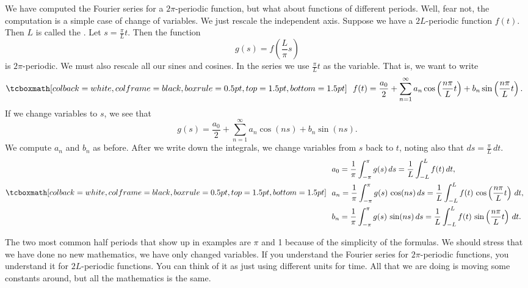 We have computed the Fourier series for a $2\pi$-periodic function, but what
about functions of different periods.  Well, fear not, the computation is a
simple case of change of variables.  We just rescale the independent
axis.  Suppose we have a $2L$-periodic function $f(t)$.  Then $L$ is called
the \emph{}.  Let $s = \frac{\pi}{L}  t$.
Then the function
\begin{equation*}
g(s) = f\left(\frac{L}{\pi} s \right)
\end{equation*}
is $2\pi$-periodic.  We must also rescale all our sines and cosines.
In the series we use $\frac{\pi}{L} t$ as the variable.  That is, we
want to write
\begin{equation*}
\mybxbg{~~
f(t) = 
\frac{a_0}{2} +
\sum_{n=1}^\infty a_n \cos \left( \frac{n \pi}{L} t \right)
+ b_n \sin \left(\frac{n \pi}{L} t \right) .
~~}
\end{equation*}
If we change variables to $s$, we see that
\begin{equation*}
g(s) = 
\frac{a_0}{2} +
\sum_{n=1}^\infty a_n \cos (n s)
+ b_n \sin (n s) .
\end{equation*}
We compute $a_n$ and $b_n$ as before.  After we write down the
integrals, we change variables from $s$ back to $t$, noting also
that $ds = \frac{\pi}{L} \, dt$.
\begin{equation*}
\mybxbg{~~
\begin{aligned}
& a_0 =
\frac{1}{\pi}
\int_{-\pi}^\pi
g(s) \, ds
=
\frac{1}{L}
\int_{-L}^L
f(t) \, dt , \\
& a_n =
\frac{1}{\pi}
\int_{-\pi}^\pi
g(s) \, \cos (n s) \, ds
=
\frac{1}{L}
\int_{-L}^L
f(t) \, \cos \left( \frac{n \pi}{L} t \right) \, dt , \\
& b_n =
\frac{1}{\pi}
\int_{-\pi}^\pi
g(s) \, \sin (n s) \, ds
=
\frac{1}{L}
\int_{-L}^L
f(t) \, \sin \left( \frac{n \pi}{L} t \right) \, dt .
\end{aligned}
~~}
\end{equation*}

The two most common half periods that show up in examples
are $\pi$ and 1 because of the simplicity of the formulas.  We should stress that we have
done no new mathematics, we have only changed variables.  If you understand 
the Fourier series for $2\pi$-periodic functions, you understand it for
$2L$-periodic functions.  You can think of it as just using
different units for time.  All that we are doing is moving some constants
around, but all the mathematics is the same.

